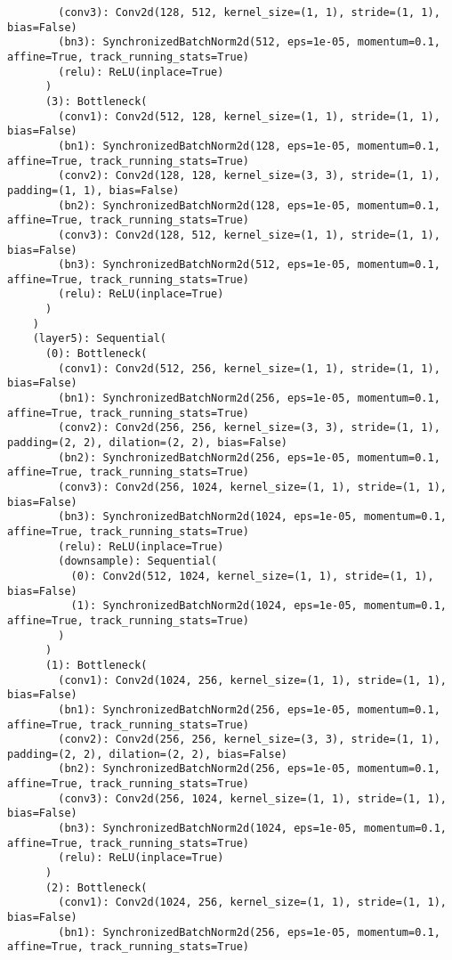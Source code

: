 \begin{verbatim}
        (conv3): Conv2d(128, 512, kernel_size=(1, 1), stride=(1, 1), bias=False)
        (bn3): SynchronizedBatchNorm2d(512, eps=1e-05, momentum=0.1, affine=True, track_running_stats=True)
        (relu): ReLU(inplace=True)
      )
      (3): Bottleneck(
        (conv1): Conv2d(512, 128, kernel_size=(1, 1), stride=(1, 1), bias=False)
        (bn1): SynchronizedBatchNorm2d(128, eps=1e-05, momentum=0.1, affine=True, track_running_stats=True)
        (conv2): Conv2d(128, 128, kernel_size=(3, 3), stride=(1, 1), padding=(1, 1), bias=False)
        (bn2): SynchronizedBatchNorm2d(128, eps=1e-05, momentum=0.1, affine=True, track_running_stats=True)
        (conv3): Conv2d(128, 512, kernel_size=(1, 1), stride=(1, 1), bias=False)
        (bn3): SynchronizedBatchNorm2d(512, eps=1e-05, momentum=0.1, affine=True, track_running_stats=True)
        (relu): ReLU(inplace=True)
      )
    )
    (layer5): Sequential(
      (0): Bottleneck(
        (conv1): Conv2d(512, 256, kernel_size=(1, 1), stride=(1, 1), bias=False)
        (bn1): SynchronizedBatchNorm2d(256, eps=1e-05, momentum=0.1, affine=True, track_running_stats=True)
        (conv2): Conv2d(256, 256, kernel_size=(3, 3), stride=(1, 1), padding=(2, 2), dilation=(2, 2), bias=False)
        (bn2): SynchronizedBatchNorm2d(256, eps=1e-05, momentum=0.1, affine=True, track_running_stats=True)
        (conv3): Conv2d(256, 1024, kernel_size=(1, 1), stride=(1, 1), bias=False)
        (bn3): SynchronizedBatchNorm2d(1024, eps=1e-05, momentum=0.1, affine=True, track_running_stats=True)
        (relu): ReLU(inplace=True)
        (downsample): Sequential(
          (0): Conv2d(512, 1024, kernel_size=(1, 1), stride=(1, 1), bias=False)
          (1): SynchronizedBatchNorm2d(1024, eps=1e-05, momentum=0.1, affine=True, track_running_stats=True)
        )
      )
      (1): Bottleneck(
        (conv1): Conv2d(1024, 256, kernel_size=(1, 1), stride=(1, 1), bias=False)
        (bn1): SynchronizedBatchNorm2d(256, eps=1e-05, momentum=0.1, affine=True, track_running_stats=True)
        (conv2): Conv2d(256, 256, kernel_size=(3, 3), stride=(1, 1), padding=(2, 2), dilation=(2, 2), bias=False)
        (bn2): SynchronizedBatchNorm2d(256, eps=1e-05, momentum=0.1, affine=True, track_running_stats=True)
        (conv3): Conv2d(256, 1024, kernel_size=(1, 1), stride=(1, 1), bias=False)
        (bn3): SynchronizedBatchNorm2d(1024, eps=1e-05, momentum=0.1, affine=True, track_running_stats=True)
        (relu): ReLU(inplace=True)
      )
      (2): Bottleneck(
        (conv1): Conv2d(1024, 256, kernel_size=(1, 1), stride=(1, 1), bias=False)
        (bn1): SynchronizedBatchNorm2d(256, eps=1e-05, momentum=0.1, affine=True, track_running_stats=True)

\end{verbatim}
